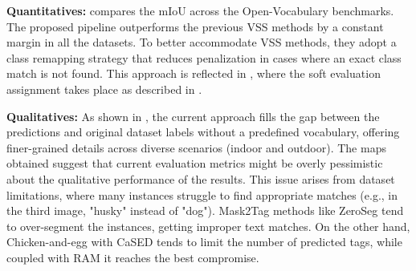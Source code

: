 \textbf{Quantitatives:}  compares the mIoU across the Open-Vocabulary benchmarks. The proposed pipeline outperforms the previous VSS methods by a constant margin in all the datasets. To better accommodate VSS methods, they adopt a class remapping strategy that reduces penalization in cases where an exact class match is not found. This approach is reflected in , where the soft evaluation assignment takes place as described in .

\textbf{Qualitatives:} As shown in , the current approach fills the gap between the predictions and original dataset labels without a predefined vocabulary, offering finer-grained details across diverse scenarios (indoor and outdoor). %
The maps obtained suggest that current evaluation metrics might be overly pessimistic about the qualitative performance of the results. This issue arises from dataset limitations, where many instances struggle to find appropriate matches (e.g., in the third image, "husky" instead of "dog"). Mask2Tag methods like ZeroSeg \cite{rewatbowornwong2023zero} tend to over-segment the instances, getting improper text matches. On the other hand, Chicken-and-egg with CaSED tends to limit the number of predicted tags, %
while coupled with RAM it reaches the best compromise.




